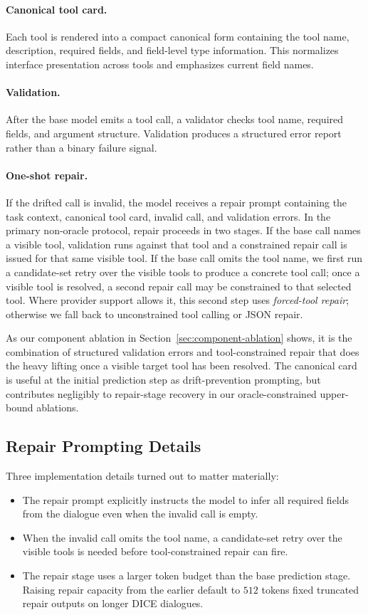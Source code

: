 \documentclass{svproc}
\begin{document}
\paragraph{Canonical tool card.}
Each tool is rendered into a compact canonical form containing the tool name,
description, required fields, and field-level type information. This normalizes
interface presentation across tools and emphasizes current field names.

\paragraph{Validation.}
After the base model emits a tool call, a validator checks tool name, required
fields, and argument structure. Validation produces a structured error report rather
than a binary failure signal.

\paragraph{One-shot repair.}
If the drifted call is invalid, the model receives a repair prompt containing the
task context, canonical tool card, invalid call, and validation errors. In the
primary non-oracle protocol, repair proceeds in two stages. If the base call names
a visible tool, validation runs against that tool and a constrained repair call is
issued for that same visible tool. If the base call omits the tool name, we first
run a candidate-set retry over the visible tools to produce a concrete tool call;
once a visible tool is resolved, a second repair call may be constrained to that
selected tool. Where provider support allows it, this second step uses
\emph{forced-tool repair}; otherwise we fall back to unconstrained tool calling or
JSON repair.

As our component ablation in Section~\ref{sec:component-ablation} shows, it is the
combination of structured validation errors and tool-constrained repair that does
the heavy lifting once a visible target tool has been resolved. The canonical card
is useful at the initial prediction step as drift-prevention prompting, but
contributes negligibly to repair-stage recovery in our oracle-constrained
upper-bound ablations.

\subsection{Repair Prompting Details}
Three implementation details turned out to matter materially:
\begin{itemize}
\item The repair prompt explicitly instructs the model to infer all required fields
from the dialogue even when the invalid call is empty.
\item When the invalid call omits the tool name, a candidate-set retry over the
visible tools is needed before tool-constrained repair can fire.
\item The repair stage uses a larger token budget than the base prediction stage.
Raising repair capacity from the earlier default to $512$ tokens fixed truncated
repair outputs on longer DICE dialogues.
\end{itemize}
\end{document}
